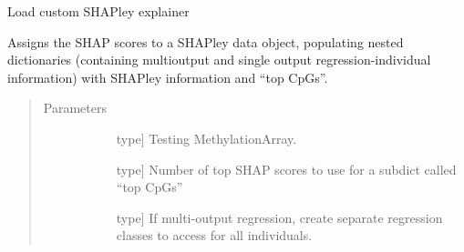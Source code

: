 \documentclass[letterpaper,10pt,english]{sphinxmanual}
\begin{document}
\begin{fulllineitems}
\begin{fulllineitems}
\begin{quote}
\begin{description}
\end{description}\end{quote}

\end{fulllineitems}


\begin{fulllineitems}
\label{\detokenize{index:methylnet.interpretation_classes.CpGExplainer.from_explainer}}
Load custom SHAPley explainer

\end{fulllineitems}


\begin{fulllineitems}
\label{\detokenize{index:methylnet.interpretation_classes.CpGExplainer.regressor_assign_scores_to_shap_data}}
Assigns the SHAP scores to a SHAPley data object, populating nested dictionaries (containing multioutput and single output regression-individual information) with SHAPley information and “top CpGs”.
\begin{quote}\begin{description}
\item[{Parameters}] \leavevmode\begin{description}
\item[{}] \leavevmode{[}type{]}
Testing MethylationArray.

\item[{}] \leavevmode{[}type{]}
Number of top SHAP scores to use for a subdict called “top CpGs”

\item[{}] \leavevmode{[}type{]}
If multi-output regression, create separate regression classes to access for all individuals.


\end{description}
\end{description}
\end{quote}
\end{fulllineitems}
\end{fulllineitems}
\end{document}

